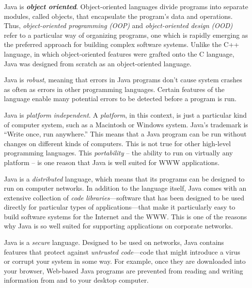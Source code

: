 \begin{BL}

\item  Java is {\it\bf object oriented}.
Object-oriented languages divide programs into separate modules,
called objects, that encapsulate the program's data and
operations. Thus, {\em object-oriented programming (OOP)} and {\em
object-oriented design (OOD)} refer to a particular way of organizing
programs, one which is rapidly emerging as the preferred approach for
building complex software systems. Unlike the C++ language, in which
object-oriented features were grafted onto the C language, Java was
designed from scratch as an object-oriented language.

\item  Java is {\it robust}, meaning that errors in Java programs
don't cause system crashes as often as errors in other programming
languages.  Certain features of the language enable many potential
errors to be detected before a program is run.

\item  Java is {\it platform independent}.
A {\em platform}, in this context, is just a particular kind of
computer system, such as a Macintosh or Windows system. Java's
trademark is ``Write once, run anywhere.'' This means that a Java
program can be run without changes on different kinds of
computers.  This is not true for other high-level programming
languages. This {\em portability} -- the ability to run on virtually
any platform -- is one reason that Java is well suited for WWW
applications.

\item Java is a {\it distributed} language, which means that its
programs can be designed to run on computer networks.  In addition to
the language itself, Java comes with an extensive collection of {\em
code libraries}---software that has been designed to be used directly
for particular types of applications---that make it particularly easy
to build software systems for the Internet and the WWW. This is one of
the reasons why Java is so well suited for supporting applications on
corporate networks.

\item  Java is a {\it secure} language.  Designed to be used
on networks, Java contains features that protect against {\it
untrusted code}---code that might introduce a virus or corrupt your
system in some way.  For example, once they are downloaded into your
browser, Web-based Java programs are prevented from reading and
writing information from and to your desktop computer.

\end{BL}


